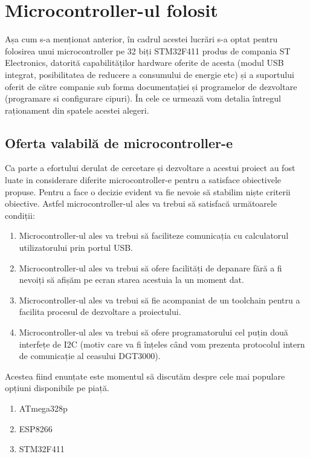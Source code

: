 \section{Microcontroller-ul folosit}
Așa cum s-a menționat anterior, în cadrul acestei lucrări s-a optat pentru folosirea unui microcontroller pe 32 biți STM32F411 produs de compania ST Electronics, datorită capabilităților hardware oferite de acesta (modul USB integrat, posibilitatea de reducere a consumului de energie etc) și a suportului oferit de către companie sub forma documentației și programelor de dezvoltare (programare si configurare cipuri). În cele ce urmează vom detalia întregul raționament din spatele acestei alegeri.

\subsection{Oferta valabilă de microcontroller-e}
Ca parte a efortului derulat de cercetare și dezvoltare a acestui proiect au fost luate in considerare diferite microcontroller-e pentru a satisface obiectivele propuse. Pentru a face o decizie evident va fie nevoie să stabilim niște criterii obiective. Astfel microcontroller-ul ales va trebui să satisfacă următoarele condiții:

\begin{enumerate}
	\item Microcontroller-ul ales va trebui să faciliteze comunicația cu calculatorul utilizatorului prin portul USB.
	\item Microcontroller-ul ales va trebui să ofere facilități de depanare fără a fi nevoiți să afișăm pe ecran starea acestuia la un moment dat.
	\item Microcontroller-ul ales va trebui să fie acompaniat de un toolchain pentru a facilita procesul de dezvoltare a proiectului.
	\item Microcontroller-ul ales va trebui să ofere programatorului cel puțin două interfețe de I2C (motiv care va fi înțeles când vom prezenta protocolul intern de comunicație al ceasului DGT3000).
\end{enumerate}

Acestea fiind enunțate este momentul să discutăm despre cele mai populare opțiuni disponibile pe piață.
\begin{enumerate}
	\item ATmega328p
	\item ESP8266
	\item STM32F411
\end{enumerate}

